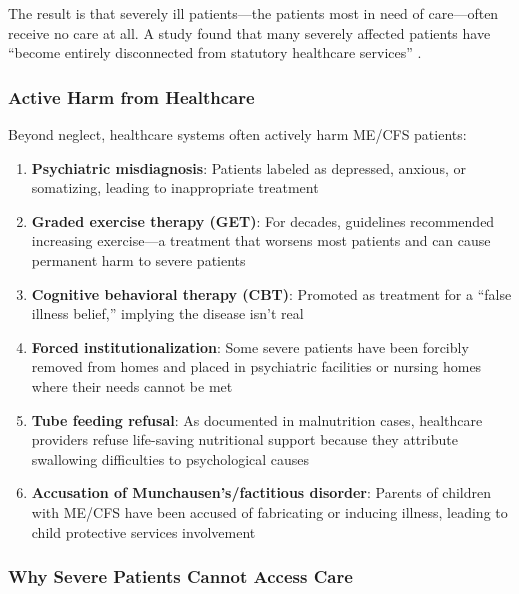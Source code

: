 The result is that severely ill patients---the patients most in need of care---often receive no care at all. A study found that many severely affected patients have ``become entirely disconnected from statutory healthcare services'' \cite{Kingdon2020housebound}.

\subsubsection{Active Harm from Healthcare}
\label{subsec:active-harm}

Beyond neglect, healthcare systems often actively harm ME/CFS patients:

\begin{enumerate}
    \item \textbf{Psychiatric misdiagnosis}: Patients labeled as depressed, anxious, or somatizing, leading to inappropriate treatment

    \item \textbf{Graded exercise therapy (GET)}: For decades, guidelines recommended increasing exercise---a treatment that worsens most patients and can cause permanent harm to severe patients

    \item \textbf{Cognitive behavioral therapy (CBT)}: Promoted as treatment for a ``false illness belief,'' implying the disease isn't real

    \item \textbf{Forced institutionalization}: Some severe patients have been forcibly removed from homes and placed in psychiatric facilities or nursing homes where their needs cannot be met

    \item \textbf{Tube feeding refusal}: As documented in malnutrition cases, healthcare providers refuse life-saving nutritional support because they attribute swallowing difficulties to psychological causes

    \item \textbf{Accusation of Munchausen's/factitious disorder}: Parents of children with ME/CFS have been accused of fabricating or inducing illness, leading to child protective services involvement
\end{enumerate}

\subsubsection{Why Severe Patients Cannot Access Care}
\label{subsec:access-barriers}

